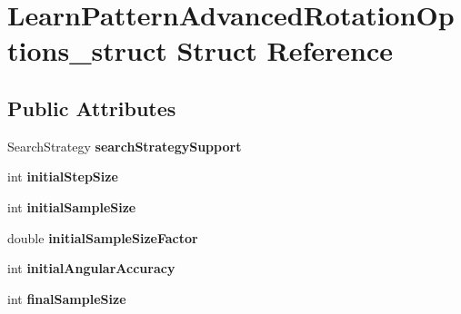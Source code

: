 \hypertarget{structLearnPatternAdvancedRotationOptions__struct}{
\section{LearnPatternAdvancedRotationOptions\_\-struct Struct Reference}
\label{structLearnPatternAdvancedRotationOptions__struct}
}
\subsection*{Public Attributes}
\begin{DoxyCompactItemize}
\item 
\hypertarget{structLearnPatternAdvancedRotationOptions__struct_afd874253b21d0be147cccc613d47cf89}{
SearchStrategy {\bfseries searchStrategySupport}}
\label{structLearnPatternAdvancedRotationOptions__struct_afd874253b21d0be147cccc613d47cf89}

\item 
\hypertarget{structLearnPatternAdvancedRotationOptions__struct_ab39e73e12db3ed6d260c52c79d207e7c}{
int {\bfseries initialStepSize}}
\label{structLearnPatternAdvancedRotationOptions__struct_ab39e73e12db3ed6d260c52c79d207e7c}

\item 
\hypertarget{structLearnPatternAdvancedRotationOptions__struct_a8e4438e8195bc98b3c5f24a83d882e78}{
int {\bfseries initialSampleSize}}
\label{structLearnPatternAdvancedRotationOptions__struct_a8e4438e8195bc98b3c5f24a83d882e78}

\item 
\hypertarget{structLearnPatternAdvancedRotationOptions__struct_af84976d135a91e58fbc51a9d8fc3340e}{
double {\bfseries initialSampleSizeFactor}}
\label{structLearnPatternAdvancedRotationOptions__struct_af84976d135a91e58fbc51a9d8fc3340e}

\item 
\hypertarget{structLearnPatternAdvancedRotationOptions__struct_a0b25d4746bd7c156c26968af39a15050}{
int {\bfseries initialAngularAccuracy}}
\label{structLearnPatternAdvancedRotationOptions__struct_a0b25d4746bd7c156c26968af39a15050}

\item 
\hypertarget{structLearnPatternAdvancedRotationOptions__struct_a34f8332c317465175ef2b4abf4e59d98}{
int {\bfseries finalSampleSize}}
\label{structLearnPatternAdvancedRotationOptions__struct_a34f8332c317465175ef2b4abf4e59d98}


\end{DoxyCompactItemize}
